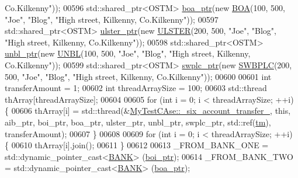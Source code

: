 \begin{DoxyCode}
{       Co.Kilkenny"}));
00596     std::shared\_ptr<OSTM> \hyperlink{class_my_test_c_ase_ae0b2db5d35e25b3139beeda0705494f0_ae0b2db5d35e25b3139beeda0705494f0}{boa\_ptr}(\textcolor{keyword}{new} \hyperlink{class_b_o_a}{BOA}(100, 500, \textcolor{stringliteral}{"Joe"}, \textcolor{stringliteral}{"Blog"}, \textcolor{stringliteral}{"High street, Kilkenny,
       Co.Kilkenny"}));
00597     std::shared\_ptr<OSTM> \hyperlink{class_my_test_c_ase_a4f9f72374d3d15be7cdf16412c4d7ed3_a4f9f72374d3d15be7cdf16412c4d7ed3}{ulster\_ptr}(\textcolor{keyword}{new} \hyperlink{class_u_l_s_t_e_r}{ULSTER}(200, 500, \textcolor{stringliteral}{"Joe"}, \textcolor{stringliteral}{"Blog"}, \textcolor{stringliteral}{"High street,
       Kilkenny, Co.Kilkenny"}));
00598     std::shared\_ptr<OSTM> \hyperlink{class_my_test_c_ase_a0ca634b597d6c0e136d632268853d5a7_a0ca634b597d6c0e136d632268853d5a7}{unbl\_ptr}(\textcolor{keyword}{new} \hyperlink{class_u_n_b_l}{UNBL}(100, 500, \textcolor{stringliteral}{"Joe"}, \textcolor{stringliteral}{"Blog"}, \textcolor{stringliteral}{"High street, Kilkenny,
       Co.Kilkenny"}));
00599     std::shared\_ptr<OSTM> \hyperlink{class_my_test_c_ase_aa8ccae9a5a7feb5bc47591c55a82d0cd_aa8ccae9a5a7feb5bc47591c55a82d0cd}{swplc\_ptr}(\textcolor{keyword}{new} \hyperlink{class_s_w_b_p_l_c}{SWBPLC}(200, 500, \textcolor{stringliteral}{"Joe"}, \textcolor{stringliteral}{"Blog"}, \textcolor{stringliteral}{"High street,
       Kilkenny, Co.Kilkenny"}));
00600     
00601     \textcolor{keywordtype}{int} transferAmount = 1;
00602     \textcolor{keywordtype}{int} threadArraySize = 100; 
00603     std::thread thArray[threadArraySize];
00604 
00605     \textcolor{keywordflow}{for} (\textcolor{keywordtype}{int} i = 0; i < threadArraySize; ++i) \{
00606         thArray[i] = std::thread(&\hyperlink{class_my_test_c_ase_a72ce436fb3c78c3d76b6c48a5a2e6a76_a72ce436fb3c78c3d76b6c48a5a2e6a76}{MyTestCAse::\_six\_account\_transfer\_}, \textcolor{keyword}{
      this}, aib\_ptr, boi\_ptr, boa\_ptr, ulster\_ptr, unbl\_ptr, swplc\_ptr, std::ref(\hyperlink{class_my_test_c_ase_a422e6e5d4ddedea384be96031c89b72b_a422e6e5d4ddedea384be96031c89b72b}{tm}), transferAmount);
00607     \}
00608     
00609     \textcolor{keywordflow}{for} (\textcolor{keywordtype}{int} i = 0; i < threadArraySize; ++i) \{
00610         thArray[i].join();
00611     \}
00612     
00613     \_FROM\_BANK\_ONE = std::dynamic\_pointer\_cast<\hyperlink{class_b_a_n_k}{BANK}> (\hyperlink{class_my_test_c_ase_a5554de9e3e6393a89c66c036c529720b_a5554de9e3e6393a89c66c036c529720b}{boi\_ptr});
00614     \_FROM\_BANK\_TWO = std::dynamic\_pointer\_cast<\hyperlink{class_b_a_n_k}{BANK}> (\hyperlink{class_my_test_c_ase_ae0b2db5d35e25b3139beeda0705494f0_ae0b2db5d35e25b3139beeda0705494f0}{boa\_ptr});

\end{DoxyCode}
